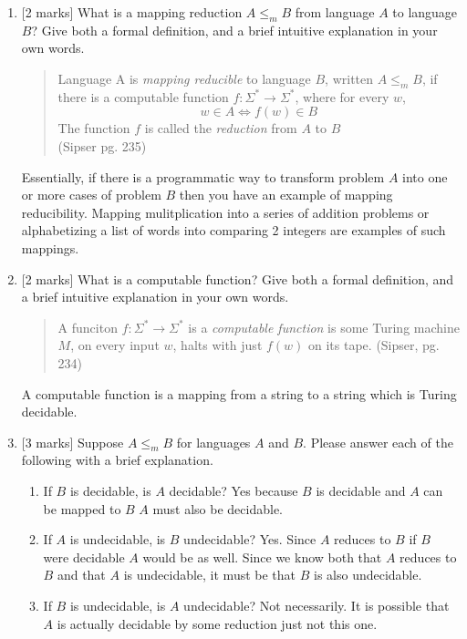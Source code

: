 \documentclass{article}
\begin{document}
\begin{enumerate}
\begin{enumerate}
            \item {[2 marks]} What is a mapping reduction $A\leq_m B$ from language $A$ to language $B$? Give both a formal definition, and a brief intuitive explanation in your own words.
            \begin{quote}
            Language A is \emph{mapping reducible} to language $B$, written $A {\leq}_m B$, if there is a computable function $f: \Sigma^* \rightarrow \Sigma^*$, where for every $w$,
            \begin{equation}
            w \in A \Leftrightarrow f(w) \in B
            \end{equation}
			The function $f$ is called the \emph{reduction} from $A$ to $B$  \\
			(Sipser pg. 235)
            \end{quote}
            Essentially, if there is a programmatic way to transform problem $A$ into one or more cases of problem $B$ then you have an example of mapping reducibility. Mapping mulitplication into a series of addition problems or alphabetizing a list of words into comparing 2 integers are examples of such mappings.
            \item {[2 marks]} What is a computable function? Give both a formal definition, and a brief intuitive explanation in your own words. \\
            \begin{quote}
            A funciton $f: \Sigma^* \rightarrow \Sigma^*$ is a \emph{computable function} is some Turing machine $M$, on every input $w$, halts with just $f(w)$ on its tape. (Sipser, pg. 234)
            \end{quote}
            A computable function is a mapping from a string to a string which is Turing decidable.
            \item {[3 marks]} Suppose $A\leq_m B$ for languages $A$ and $B$. Please answer each of the following with a brief explanation.
                \begin{enumerate}
                    \item If $B$ is decidable, is $A$ decidable? Yes because $B$ is decidable and $A$ can be mapped to $B$ $A$ must also be decidable.
                    \item If $A$ is undecidable, is $B$ undecidable? Yes. Since $A$ reduces to $B$ if $B$ were decidable $A$ would be as well. Since we know both that $A$ reduces to $B$ and that $A$ is undecidable, it must be that $B$ is also undecidable.
                    \item If $B$ is undecidable, is $A$ undecidable? Not necessarily. It is possible that $A$ is actually decidable by some reduction just not this one. 
                \end{enumerate}


\end{enumerate}
\end{enumerate}
\end{document}
